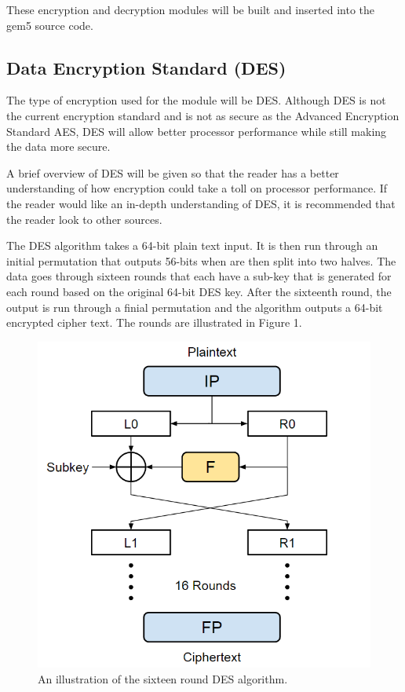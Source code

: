 \documentclass[letterpaper, 10 pt, conference]{ieeeconf}  %
\begin{document}
These encryption and decryption modules will be built and inserted into the gem5 source code.

\subsection{Data Encryption Standard (DES)}

The type of encryption used for the module will be DES.  Although DES is not the current encryption standard and is not as secure as the Advanced Encryption Standard AES, DES will allow better processor performance while still making the data more secure.

A brief overview of DES will be given so that the reader has a better understanding of how encryption could take a toll on processor performance.  If the reader would like an in-depth understanding of DES, it is recommended that the reader look to other sources.

The DES algorithm takes a 64-bit plain text input.  It is then run through an initial permutation that outputs 56-bits when are then split into two halves.  The data goes through sixteen rounds that each have a sub-key that is generated for each round based on the original 64-bit DES key.  After the sixteenth round, the output is run through a finial permutation and the algorithm outputs a 64-bit encrypted cipher text.  The rounds are illustrated in Figure 1.

\begin{figure}[thpb]
	\centering
	\includegraphics[scale=.50]{DesRounds}
    \caption{An illustration of the sixteen round DES algorithm.}
\end{figure}
\end{document}
